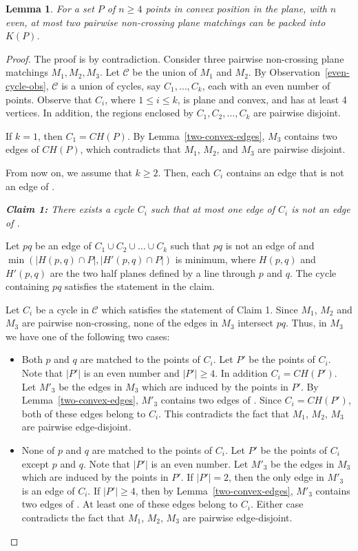 \documentclass[11pt,a4paper]{article}
\newcommand{\CH}[1]{\text{$CH(#1)$}}
\newcommand{\Kn}[1]{K#1}
\newtheorem{lemma}{Lemma}
\begin{document}
\begin{lemma}
 \label{2-non-crossing}
For a set $P$ of $n\ge 4$ points in convex position in the plane, with $n$ even, at most two pairwise non-crossing plane matchings can be packed into $\Kn{(P)}$.
\end{lemma}
\begin{proof}
 The proof is by contradiction. Consider three pairwise non-crossing plane matchings $M_1,M_2,M_3$. Let $\mathcal{C}$ be the union of $M_1$ and $M_2$. By Observation~\ref{even-cycle-obs}, $\mathcal{C}$ is a union of cycles, say $C_1,\dots, C_k$, each with an even number of points. Observe that $C_i$, where $1\le i\le k$, is plane and convex, and has at least 4 vertices. 
In addition, the regions enclosed by $C_1,C_2,\dots,C_k$ are pairwise disjoint.


If $k=1$, then $C_1=\CH{P}$. By Lemma~\ref{two-convex-edges}, $M_3$ contains two edges of $\CH{P}$, which contradicts that $M_1$, $M_2$, and $M_3$ are pairwise disjoint. 

From now on, we assume that $k\ge 2$. Then, each $C_i$ contains an edge that is not an edge of \CH{P}.


\vspace{10pt}
{\em {\bf Claim 1:} There exists a cycle $C_i$ such that at most one edge of $C_i$ is not an edge of \CH{P}.}

Let $pq$ be an edge of $C_1\cup C_2 \cup \dots\cup C_k$ such that $pq$ is not an edge of \CH{P} and $\min(|H(p,q)\cap P|,|H'(p,q)\cap P|)$ is minimum, where $H(p,q)$ and $H'(p,q)$ are the two half planes defined by a line through $p$ and $q$. The cycle containing $pq$ satisfies the statement in the claim.
\vspace{10pt}

Let $C_i$ be a cycle in $\mathcal{C}$ which satisfies the statement of Claim 1. Since $M_1$, $M_2$ and $M_3$ are pairwise non-crossing, none of the edges in $M_3$ intersect $pq$. Thus, in $M_3$ we have one of the following two cases:
\begin{itemize}
 \item Both $p$ and $q$ are matched to the points of $C_i$. Let $P'$ be the points of $C_i$. Note that $|P'|$ is an even number and $|P'|\ge 4$. In addition $C_i=\CH{P'}$. Let $M'_3$ be the edges in $M_3$ which are induced by the points in $P'$. By Lemma~\ref{two-convex-edges}, $M'_3$ contains two edges of \CH{P'}. Since $C_i=\CH{P'}$, both of these edges belong to $C_i$. This contradicts the fact that $M_1$, $M_2$, $M_3$ are pairwise edge-disjoint.
 \item None of $p$ and $q$ are matched to the points of $C_i$. Let $P'$ be the points of $C_i$ except $p$ and $q$. Note that $|P'|$ is an even number. Let $M'_3$ be the edges in $M_3$ which are induced by the points in $P'$. If $|P'|=2$, then the only edge in $M'_3$ is an edge of $C_i$. If $|P'|\ge 4$, then by Lemma~\ref{two-convex-edges}, $M'_3$ contains two edges of \CH{P'}. At least one of these edges belong to $C_i$. Either case contradicts the fact that $M_1$, $M_2$, $M_3$ are pairwise edge-disjoint.
\end{itemize}
\end{proof}
\end{document}
